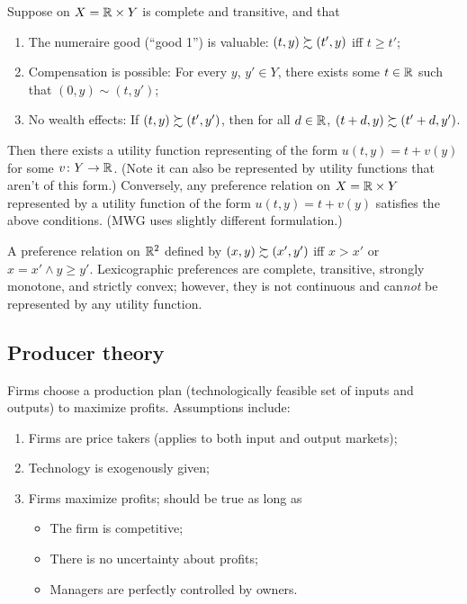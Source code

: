 \documentclass[8pt,letterpaper, landscape]{extarticle} %
\begin{document}
\begin{multicols}{3}
\begin{description}
 Suppose \pref{} on $ X = \mathbb{R} \times Y $ is complete and transitive, and that
\begin{enumerate}
\item The numeraire good (``good 1'') is valuable: $ (t,y) \succsim (t', y) $ iff $ t \geq t' $;
\item Compensation is possible: For every $ y $, $ y' \in Y $, there exists some $ t \in \mathbb{R} $ such that $ (0, y) \sim (t, y' ) $;
\item No wealth effects: If $ (t,y) \succsim (t', y') $, then for all $ d \in \mathbb{R} $, $ (t + d,y) \succsim (t'+d, y') $.
\end{enumerate}
Then there exists a utility function representing \pref{} of the form $ u(t,y) = t + v(y) $ for some $ v \colon Y \to \mathbb{R} $. (Note it can also be represented by utility functions that aren't of this form.) Conversely, any preference relation \pref{} on $ X = \mathbb{R} \times Y $ represented by a utility function of the form $ u(t,y) = t + v(y) $ satisfies the above conditions. (MWG uses slightly different formulation.)

 A preference relation \pref{} on $ \mathbb{R}^2 $ defined by $ (x,y) \succsim (x',y') $ iff $ x>x' $ or $ x = x' \land y \geq y' $. Lexicographic preferences are complete, transitive, strongly monotone, and strictly convex; however, they is not continuous and can\textit{not} be represented by any utility function.

\subsection{Producer theory}
 Firms choose a production plan (technologically feasible set of inputs and outputs) to maximize profits. Assumptions include:
\begin{enumerate}
\item Firms are price takers (applies to both input and output markets);
\item Technology is exogenously given;
\item Firms maximize profits; should be true as long as
\begin{itemize}
\item The firm is competitive;
\item There is no uncertainty about profits;
\item Managers are perfectly controlled by owners.
\end{itemize}
\end{enumerate}


\end{description}
\end{multicols}
\end{document}
